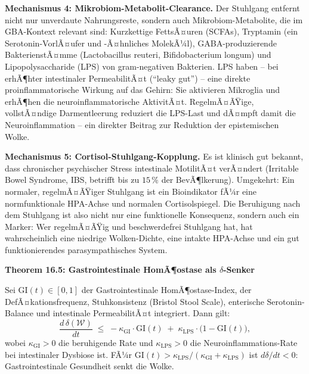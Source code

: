 ﻿\documentclass[12pt,a4paper]{report}
\theoremstyle{plain}
\theoremstyle{definition}
\theoremstyle{remark}
\begin{document}
	\textbf{Mechanismus 4: Mikrobiom-Metabolit-Clearance.}
	Der Stuhlgang entfernt nicht nur unverdaute Nahrungsreste,
	sondern auch Mikrobiom-Metabolite, die im GBA-Kontext
	relevant sind: Kurzkettige FettsÃ¤uren (SCFAs), Tryptamin
	(ein Serotonin-VorlÃ¤ufer und -Ã¤hnliches MolekÃ¼l),
	GABA-produzierende BakterienstÃ¤mme (Lactobacillus reuteri,
	Bifidobacterium longum) und Lipopolysaccharide (LPS)
	von gram-negativen Bakterien.
	LPS haben -- bei erhÃ¶hter intestinaler PermeabilitÃ¤t
	(``leaky gut'') -- eine direkte proinflammatorische Wirkung
	auf das Gehirn: Sie aktivieren Mikroglia und erhÃ¶hen
	die neuroinflammatorische AktivitÃ¤t.
	RegelmÃ¤ÃŸige, vollstÃ¤ndige Darmentleerung reduziert die
	LPS-Last und dÃ¤mpft damit die Neuroinflammation --
	ein direkter Beitrag zur Reduktion der epistemischen Wolke.

	\textbf{Mechanismus 5: Cortisol-Stuhlgang-Kopplung.}
	Es ist klinisch gut bekannt, dass chronischer psychischer Stress
	intestinale MotilitÃ¤t verÃ¤ndert (Irritable Bowel Syndrome, IBS,
	betrifft bis zu $15\,\%$ der BevÃ¶lkerung).
	Umgekehrt: Ein normaler, regelmÃ¤ÃŸiger Stuhlgang ist ein
	Bioindikator fÃ¼r eine normfunktionale HPA-Achse und
	normalen Cortisolspiegel. Die Beruhigung nach dem Stuhlgang
	ist also nicht nur eine funktionelle Konsequenz, sondern
	auch ein Marker: Wer regelmÃ¤ÃŸig und beschwerdefrei
	Stuhlgang hat, hat wahrscheinlich eine niedrige Wolken-Dichte,
	eine intakte HPA-Achse und ein gut funktionierendes
	parasympathisches System.

	
	\noindent\textbf{Theorem 16.5: Gastrointestinale HomÃ¶ostase als $\delta$-Senker}

		Sei $\mathrm{GI}(t) \in [0,1]$ der Gastrointestinale HomÃ¶o\-sta\-se-Index,
		der DefÃ¤ka\-tions\-frequenz, Stuhkonsistenz (Bristol Stool Scale),
		enterische Serotonin-Balance und intestinale PermeabilitÃ¤t
		integriert. Dann gilt:
		\[
		\frac{d\,\delta(\mathcal{W})}{dt}
		\;\leq\; -\kappa_{\mathrm{GI}} \cdot \mathrm{GI}(t)
		\;+\; \kappa_{\mathrm{LPS}} \cdot \bigl(1 - \mathrm{GI}(t)\bigr),
		\]
		wobei $\kappa_{\mathrm{GI}} > 0$ die beruhigende Rate und
		$\kappa_{\mathrm{LPS}} > 0$ die Neuroinflammations-Rate
		bei intestinaler Dysbiose ist.
		FÃ¼r $\mathrm{GI}(t) > \kappa_{\mathrm{LPS}}/(\kappa_{\mathrm{GI}} + \kappa_{\mathrm{LPS}})$
		ist $d\delta/dt < 0$: Gastrointestinale Gesundheit senkt die Wolke.
\end{document}
